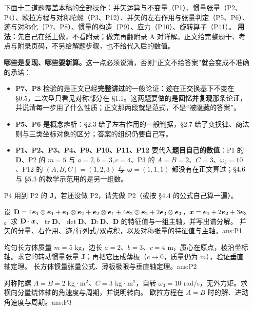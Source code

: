 \documentclass[11pt]{ctexart}
\newcommand{\ten}[1]{\mathbf{#1}}
\newcommand{\tr}{\operatorname{tr}}
\let\orighdr\hdr
\renewcommand{\hdr}[2]{\par\needspace{10\baselineskip}\orighdr{#1}{#2}}
\begin{document}
\label{sec:exercises}

下面十二道题覆盖本稿的全部操作：并矢运算与不变量（P1）、惯量张量（P2、P4）、欧拉方程与对称陀螺（P3、P12）、并矢的左右作用与张量判定（P5、P6）、迹与对称化（P7、P8）、惯量的构造（P9）、应力（P10）、旋转算子（P11）。
\textbf{用法：}先自己在纸上做，不看附录；做完再翻附录 A 对详解。正文给完整题干、考点与附录页码，不另给解题步骤，也不给代入后的数值。
\par\smallskip
\textbf{哪些是复现、哪些要新算。}这一点必须说清，否则“正文不给答案”就会变成不准确的承诺：
\begin{itemize}[leftmargin=1.8em,itemsep=2pt]
\item \textbf{P7、P8} 检验的是正文已经\textbf{完整讲过}的一般论证：迹在正交换基下不变在 \S0.5，二次型只看见对称部分在 \S1.1。这两题要做的是\textbf{回忆并复现}那条论证，并说清每一步用了什么性质；正文那两段就是范式，不是“被隐藏的答案”。
\item \textbf{P5、P6} 是概念辨析：\S2.3 给了左右作用的一般判据，\S2.7 给了变换律、商法则与三类坐标对象的区分；答案的组织仍要自己写。
\item \textbf{P1、P2、P3、P4、P9、P10、P11、P12} 要代入\textbf{题目自己的数值}：P1 的 $\ten D$、P2 的 $m=5$ 与 $a=2,b=3,c=4$、P3 的 $A=B=2$、$C=3$、$\omega_3=10$、P12 的 $(A,B,C)=(1,2,3)$ 与 $\boldsymbol\omega=(1,1,1)$ 都没有在正文算过；\S4.6 与 \S5.3 的教学示范用的是另一组数。
\end{itemize}
P4 用到 P2 的 $\ten J$，若还没做 P2，请先做 P2（或按 \S4.4 的公式自己算一遍）。

{设 $\ten D=4\vect e_1\otimes\vect e_1+\vect e_1\otimes\vect e_2+\vect e_2\otimes\vect e_1+4\vect e_2\otimes\vect e_2+2\vect e_3\otimes\vect e_3$，$\boldsymbol{x}=\boldsymbol{e}_1+2\boldsymbol{e}_2+3\boldsymbol{e}_3$。求 $\ten D\cdot\vect x$、$\tr\ten D$、$\det\ten D$、$\ten D:\ten D$、$\ten D$ 的特征值与一组主轴，并写出谱分解。}
{并矢的分量、右作用、迹/行列式/双点积，以及对称张量的特征值与主轴。}{ans:P1}

{均匀长方体质量 $m=5$ kg，边长 $a=2$、$b=3$、$c=4$ m，质心在原点，棱沿坐标轴。求它的转动惯量张量 $\ten J$；再把它压成薄板（$c\to0$，质量仍为 $m$），验证垂直轴定理。}
{长方体惯量张量公式、薄板极限与垂直轴定理。}{ans:P2}

{对称陀螺 $A=B=2$ kg·m$^2$、$C=3$ kg·m$^2$，自转 $\omega_3=10$ rad/s，无外力矩。求横向分量绕体轴的角速度与周期，并说明转向。}
{欧拉方程在 $A=B$ 时的解、进动角速度与周期。}{ans:P3}
\end{document}
